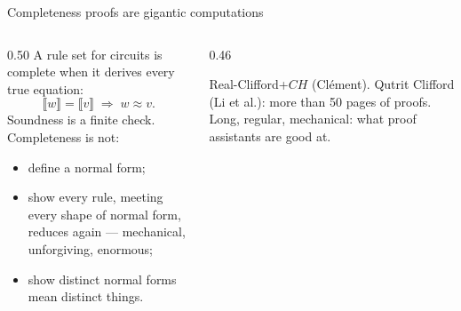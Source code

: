 
\begin{frame}{Completeness proofs are gigantic computations}
\begin{columns}[c]
\begin{column}{0.50\textwidth}
A rule set for circuits is \alert{complete} when it derives every true
equation:
\[
  \llbracket w\rrbracket = \llbracket v\rrbracket \;\Longrightarrow\; w \approx v .
\]
Soundness is a finite check. Completeness is not:
\begin{itemize}
  \item define a \alert{normal form};
  \item show every rule, meeting every shape of normal form, reduces again
        --- mechanical, unforgiving, enormous;
  \item show distinct normal forms mean distinct things.
\end{itemize}
\end{column}
\begin{column}{0.46\textwidth}
\centering
{}

\vspace{4pt}
{\small Real-Clifford+$CH$ (Clément). Qutrit Clifford (Li et al.): more
than 50 pages of proofs. Long, regular, mechanical: what proof assistants
are good at.}
\end{column}
\end{columns}
\end{frame}

